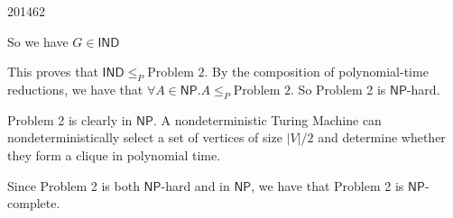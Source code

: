 \documentclass[10pt,\jkfside,a4paper]{article}
\begin{document}
\begin{examquestion}{2014}{6}{2}
\begin{enumerate}[label=(\alph*)]
\begin{enumerate}[label=(\roman*)]
\begin{itemize}
\begin{itemize}
So we have $G \in \mathsf{IND}$

\end{itemize}

\end{itemize}

This proves that $\mathsf{IND} \le_P \text{Problem 2}$. By the composition
of polynomial-time reductions, we have that $\forall A \in \mathsf{NP}. A \le_P \text{Problem 2}$.
So Problem 2 is $\mathsf{NP}$-hard.

Problem 2 is clearly in $\mathsf{NP}$. A nondeterministic Turing Machine can
nondeterministically select a set of vertices of size $|V|/2$ and determine
whether they form a clique in polynomial time.

Since Problem 2 is both $\mathsf{NP}$-hard and in $\mathsf{NP}$, we have
that Problem 2 is $\mathsf{NP}$-complete.

\end{enumerate}

\end{enumerate}

\end{examquestion}
\end{document}

